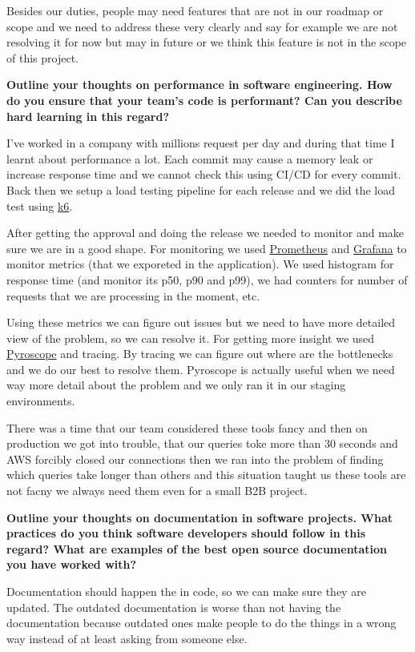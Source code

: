 Besides our duties, people may need features that are not in our roadmap or scope and we need to address these very
clearly and say for example we are not resolving it for now but may in future or we think this feature is not in the
scope of this project.

\noindent
\textbf{Outline your thoughts on performance in software engineering. How do you ensure that your team's code is performant?
Can you describe hard learning in this regard?}

I've worked in a company with millions request per day and during that time I learnt about performance a lot.
Each commit may cause a memory leak or increase response time and we cannot check this using CI/CD for every commit.
Back then we setup a load testing pipeline for each release and we did the load test using \href{https://github.com/grafana/k6}{k6}.

After getting the approval and doing the release we needed to monitor and make sure we are in a good shape.
For monitoring we used \href{https://prometheus.io/}{Prometheus} and \href{https://grafana.com/}{Grafana} to monitor
metrics (that we exporeted in the application). We used histogram for response time (and monitor its p50, p90 and p99),
we had counters for number of requests that we are processing in the moment, etc.

Using these metrics we can figure out issues but we need to have more detailed view of the problem, so we can resolve it.
For getting more insight we used \href{https://pyroscope.io/}{Pyroscope} and tracing. By tracing we can figure out where are the bottlenecks
and we do our best to resolve them. Pyroscope is actually useful when we need way more detail about the problem
and we only ran it in our staging environments.

There was a time that our team considered these tools fancy and then on production we got into trouble,
that our queries toke more than 30 seconds and AWS forcibly closed our connections then we ran into the problem of
finding which queries take longer than others and this situation taught us these tools are not facny we always
need them even for a small B2B project.

\noindent
\textbf{Outline your thoughts on documentation in software projects. What practices do you think software developers
should follow in this regard? What are examples of the best open source documentation you have worked with?}

Documentation should happen the in code, so we can make sure they are updated. The outdated documentation is worse than
not having the documentation because outdated ones make people to do the things in a wrong way instead of at least
asking from someone else.

